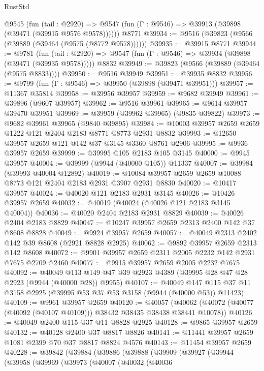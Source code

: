 \begin{lexlean}{RustStd}
\begin{coremodule}
    @9545
      (fun (tail : @2920) =>
      @9547 (fun (Γ : @9546) => @39913 (@39898 (@39471 (@39915 @9576 @9578))))))
    @8771
@39934 := @9516 (@39823 (@9566 (@39889 (@39464 (@9575 (@8772 @9578))))))
@39935 := @39915 @8771
@39944 := @9781
    (fun (tail : @2920) => @9547 (fun (Γ : @9546) => @39934 (@39898 (@39471 (@39935 @9578)))))
    @8832
@39949 := @39823 (@9566 (@39889 (@39464 (@9575 @8833))))
@39950 := @9516 @39949
@39951 := @39935 @8832
@39956 := @9799 (fun (Γ : @9546) => @39950 (@39898 (@39471 @39951)))
@39957 := @11367 @35814
@39958 := @39956 @39957
@39959 := @9682 @39949
@39961 := @39896 (@9607 @39957)
@39962 := @9516 @39961
@39965 := @9614 @39957 @39470 @39951
@39969 := @39959 (@39962 @39965) (@9835 @39822)
@39973 := @9682 @39961 @39965 (@9840 @39895)
@39984 := @10003 @39957 @2659 @2659 @1222 @121 @2404 @2183 @8771 @8773 @2931 @8832
@39993 := @12650 @39957 @2659 @121 @142 @37 @3145 @3360 @8761 @2906
@39995 := @9936 @39957 @2659
@39999 := @39995 @105 @2183 @105 @3145
@40000 := @9945 @39957
@40004 := @39999 (@9944 (@40000 @105)) @11337
@40007 := @39984 (@39993 @40004 @12892)
@40019 := @10084 @39957 @2659 @2659 @10088 @8773 @121 @2404 @2183 @2931 @3907 @2931 @8830
@40020 := @10417 @39957
@40024 := @40020 @121 @2183 @2931 @3145
@40026 := @10426 @39957 @2659
@40032 := @40019 (@40024 (@40026 @121 @2183 @3145 @40004))
@40036 := @40020 @2404 @2183 @2931 @8829
@40039 := @40026 @2404 @2183 @8829
@40047 := @10247 @39957 @2659 @2313 @2400 @142 @37 @8608 @8828
@40049 := @9924 @39957 @2659
@40057 := @40049 @2313 @2402 @142 @39 @8608 (@2921 @8828 @2925)
@40062 := @9892 @39957 @2659 @2313 @142 @8608
@40072 := @9901 @39957 @2659 @2311 @2005 @2232 @142 @2931 @7675 @2709 @2460
@40077 := @9915 @39957 @2659 @2005 @2232 @7675
@40092 := @40049 @113 @149 @47 @39 @2923 @4389 (@39995 @28 @47 @28 @2923 (@9944 (@40000 @28)) @9955)
@40107 := @40049
    @147
    @115
    @37
    @11
    @3158
    @2925
    (@39995 @53 @37 @53 @3158 (@9944 (@40000 @53)) @11423)
@40109 := @9961 @39957 @2659
@40120 := @40057
    (@40062 (@40072 (@40077 (@40092 (@40107 @40109))) @38432 @38435 @38438 @38441 @10078))
@40126 := @40049 @2400 @115 @37 @11 @8828 @2925
@40128 := @9865 @39957 @2659
@40132 := @40128 @2400 @37 @8817 @8826
@40141 := @11441 @39957 @2659 @1081 @2399 @70 @37 @8817 @8824 @4576
@40143 := @11454 @39957 @2659
@40228 := @39842
    (@39884
      (@39886
        (@39888
          (@39909
            (@39927
              (@39944
                (@39958
                  (@39969
                    (@39973
                      (@40007
                        (@40032
                          (@40036

\end{coremodule}
\end{lexlean}
